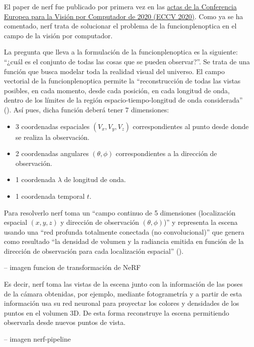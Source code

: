 \documentclass[a4paper, 12pt, spanish, twoside]{article}
\begin{document}
El paper de \acrshort{nerf} fue publicado por primera vez en las \href{https://www.ecva.net/papers.php}{actas de la Conferencia Europea para la Visión por Computador de 2020 (ECCV 2020)}. Como ya se ha comentado, \acrshort{nerf} trata de solucionar el problema de la \gls{funcionplenoptica} en el campo de la visión por computador.  

La pregunta que lleva a la formulación de la \gls{funcionplenoptica} es la siguiente: “¿cuál es el conjunto de todas las cosas que se pueden observar?”. Se trata de una función que busca modelar toda la realidad visual del universo. El campo vectorial de la \gls{funcionplenoptica} permite la “reconstrucción de todas las vistas posibles, en cada momento, desde cada posición, en cada longitud de onda, dentro de los límites de la región espacio-tiempo-longitud de onda considerada” (\cite{adelson:plenoptic}). Así pues, dicha función deberá tener 7 dimensiones:  

\begin{itemize} 
\item 3 coordenadas espaciales $(V_x,V_y,V_z)$ correspondientes al punto desde donde se realiza la observación. 
\item 2 coordenadas angulares $(\theta,\phi)$ correspondientes a la dirección de observación. 
\item 1 coordenada $\lambda$ de longitud de onda. 
\item 1 coordenada temporal $t$.  
\end{itemize} 

Para resolverlo \acrshort{nerf} toma un “campo continuo de 5 dimensiones (localización espacial $(x, y, z)$ y dirección de observación $(\theta, \phi)$)” y representa la escena usando una “red profunda totalmente conectada (no convolucional)” que genera como resultado “la densidad de volumen y la radiancia emitida en función de la dirección de observación para cada localización espacial” (\cite{mildenhall2020nerf}). 

-- imagen funcion de transformación de NeRF 

Es decir, \acrshort{nerf} toma las vistas de la escena junto con la información de las poses de la cámara obtenidas, por ejemplo, mediante fotogrametría y a partir de esta información usa su red neuronal para proyectar los colores y densidades de los puntos en el volumen 3D. De esta forma reconstruye la escena permitiendo observarla desde nuevos puntos de vista. 

-- imagen nerf-pipeline 
\end{document}
